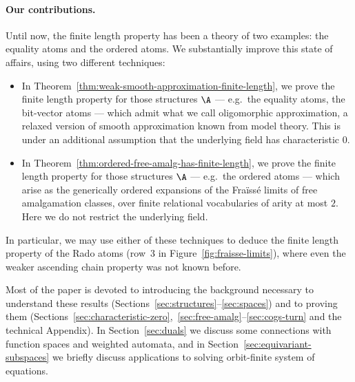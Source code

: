 \paragraph*{Our contributions.} 
Until now, the finite length property has been a theory of two examples: the equality atoms and the ordered atoms. 
We substantially improve this state of affairs, using two different techniques:
\begin{itemize}
    \item 
    In Theorem~\ref{thm:weak-smooth-approximation-finite-length}, we prove the finite length property for those structures $\A$ --- 
    e.g.~the equality atoms, the bit-vector atoms --- 
    which admit what we call oligomorphic approximation, a relaxed version of smooth approximation known from model theory. This is under an additional assumption that the underlying field has characteristic $0$.

    \item 
    In Theorem~\ref{thm:ordered-free-amalg-has-finite-length}, we prove the finite length property for those structures $\A$ --- 
    e.g.~the ordered atoms --- 
    which arise as the generically ordered expansions of the Fraïssé limits of free amalgamation classes, over finite relational vocabularies of arity at most $2$. 
    Here we do not restrict the underlying field.
\end{itemize}
In particular, we may use either of these techniques to deduce the finite length property of the Rado atoms (row~3 in Figure~\ref{fig:fraisse-limits}), where even the weaker ascending chain property was not known before.

Most of the paper is devoted to introducing the background necessary to understand these results (Sections~\ref{sec:structures}--\ref{sec:spaces}) and to proving them (Sections~\ref{sec:characteristic-zero},~\ref{sec:free-amalg}--\ref{sec:cogs-turn} and the technical Appendix). 
In Section~\ref{sec:duals} we discuss some connections with function spaces and weighted automata, and in Section~\ref{sec:equivariant-subspaces} we  briefly discuss  applications to solving orbit-finite system of equations.
